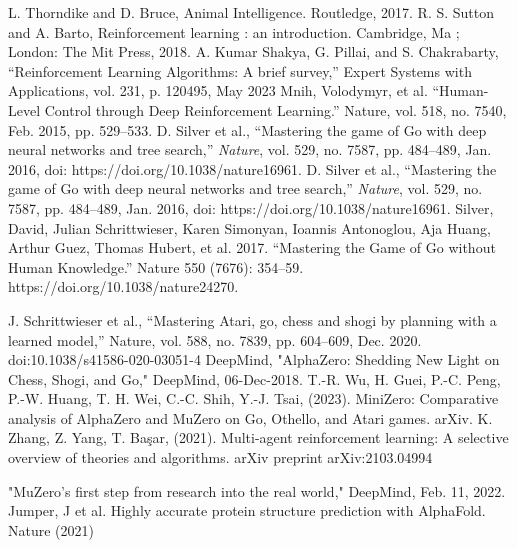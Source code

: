 \documentclass[conference]{IEEEtran}
\begin{document}
\begin{thebibliography}{00}
     L. Thorndike and D. Bruce, Animal Intelligence. Routledge, 2017.
     R. S. Sutton and A. Barto, Reinforcement learning : an introduction. Cambridge, Ma ; London: The Mit Press, 2018.
     A. Kumar Shakya, G. Pillai, and S. Chakrabarty, “Reinforcement Learning Algorithms: A brief survey,” Expert Systems with Applications, vol. 231, p. 120495, May 2023
     Mnih, Volodymyr, et al. “Human-Level Control through Deep Reinforcement Learning.” Nature, vol. 518, no. 7540, Feb. 2015, pp. 529–533.
     D. Silver et al., “Mastering the game of Go with deep neural networks and tree search,” \textit{Nature}, vol. 529, no. 7587, pp. 484–489, Jan. 2016, doi: https://doi.org/10.1038/nature16961.
     D. Silver et al., “Mastering the game of Go with deep neural networks and tree search,” \textit{Nature}, vol. 529, no. 7587, pp. 484–489, Jan. 2016, doi: https://doi.org/10.1038/nature16961.
     Silver, David, Julian Schrittwieser, Karen Simonyan, Ioannis Antonoglou, Aja Huang, Arthur Guez, Thomas Hubert, et al. 2017. “Mastering the Game of Go without Human Knowledge.” Nature 550 (7676): 354–59. https://doi.org/10.1038/nature24270.

     J. Schrittwieser et al., “Mastering Atari, go, chess and shogi by planning with a learned model,” Nature, vol. 588, no. 7839, pp. 604–609, Dec. 2020. doi:10.1038/s41586-020-03051-4 
     DeepMind, "AlphaZero: Shedding New Light on Chess, Shogi, and Go," DeepMind, 06-Dec-2018.
     T.-R. Wu, H. Guei, P.-C. Peng, P.-W. Huang, T. H. Wei, C.-C. Shih, Y.-J. Tsai, (2023). MiniZero: Comparative analysis of AlphaZero and MuZero on Go, Othello, and Atari games. arXiv.
     K. Zhang, Z. Yang, T. Ba\c{s}ar, (2021). Multi-agent reinforcement learning: A selective overview of theories and algorithms. arXiv preprint arXiv:2103.04994

    
     "MuZero’s first step from research into the real world," DeepMind, Feb. 11, 2022.
     Jumper, J et al. Highly accurate protein structure prediction with AlphaFold. Nature (2021)

\end{thebibliography}
\vspace{12pt}
\end{document}
